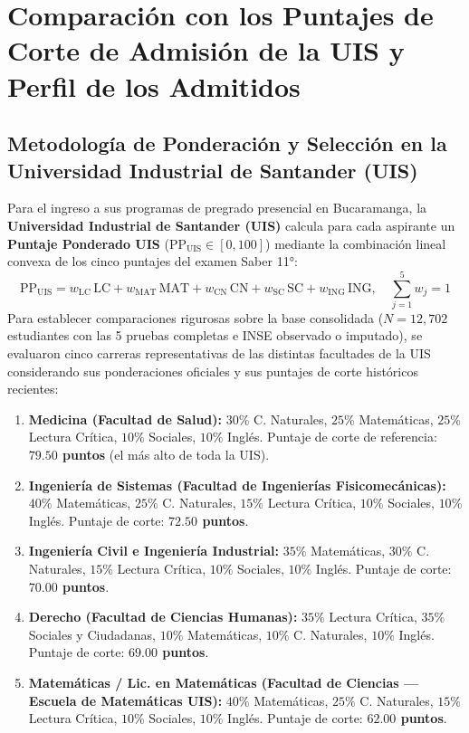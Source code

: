 \documentclass[11pt,letterpaper]{article}
\begin{document}
\section{Comparación con los Puntajes de Corte de Admisión de la UIS y Perfil de los Admitidos}

\subsection{Metodología de Ponderación y Selección en la Universidad Industrial de Santander (UIS)}
Para el ingreso a sus programas de pregrado presencial en Bucaramanga, la \textbf{Universidad Industrial de Santander (UIS)} calcula para cada aspirante un \textbf{Puntaje Ponderado UIS} ($\text{PP}_{\text{UIS}} \in [0, 100]$) mediante la combinación lineal convexa de los cinco puntajes del examen Saber 11°:
\begin{equation}
\text{PP}_{\text{UIS}} = w_{\text{LC}}\,\text{LC} + w_{\text{MAT}}\,\text{MAT} + w_{\text{CN}}\,\text{CN} + w_{\text{SC}}\,\text{SC} + w_{\text{ING}}\,\text{ING}, \quad \sum_{j=1}^5 w_j = 1
\end{equation}
Para establecer comparaciones rigurosas sobre la base consolidada ($N = 12,702$ estudiantes con las 5 pruebas completas e INSE observado o imputado), se evaluaron cinco carreras representativas de las distintas facultades de la UIS considerando sus ponderaciones oficiales y sus puntajes de corte históricos recientes:
\begin{enumerate}
    \item \textbf{Medicina (Facultad de Salud):} $30\%$ C. Naturales, $25\%$ Matemáticas, $25\%$ Lectura Crítica, $10\%$ Sociales, $10\%$ Inglés. Puntaje de corte de referencia: \textbf{$79.50$ puntos} (el más alto de toda la UIS).
    \item \textbf{Ingeniería de Sistemas (Facultad de Ingenierías Fisicomecánicas):} $40\%$ Matemáticas, $25\%$ C. Naturales, $15\%$ Lectura Crítica, $10\%$ Sociales, $10\%$ Inglés. Puntaje de corte: \textbf{$72.50$ puntos}.
    \item \textbf{Ingeniería Civil e Ingeniería Industrial:} $35\%$ Matemáticas, $30\%$ C. Naturales, $15\%$ Lectura Crítica, $10\%$ Sociales, $10\%$ Inglés. Puntaje de corte: \textbf{$70.00$ puntos}.
    \item \textbf{Derecho (Facultad de Ciencias Humanas):} $35\%$ Lectura Crítica, $35\%$ Sociales y Ciudadanas, $10\%$ Matemáticas, $10\%$ C. Naturales, $10\%$ Inglés. Puntaje de corte: \textbf{$69.00$ puntos}.
    \item \textbf{Matemáticas / Lic. en Matemáticas (Facultad de Ciencias — Escuela de Matemáticas UIS):} $40\%$ Matemáticas, $25\%$ C. Naturales, $15\%$ Lectura Crítica, $10\%$ Sociales, $10\%$ Inglés. Puntaje de corte: \textbf{$62.00$ puntos}.
\end{enumerate}
\end{document}
